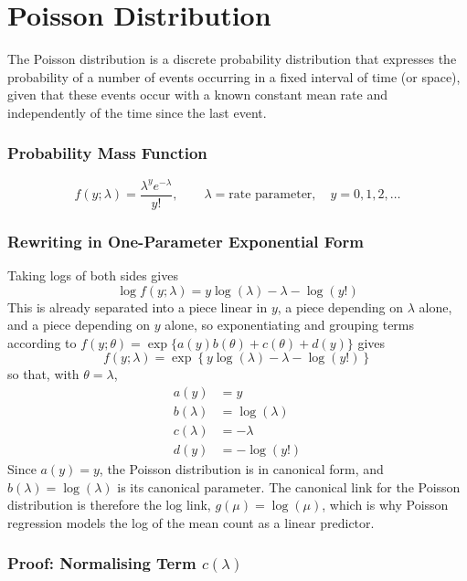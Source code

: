 \documentclass[12pt,a4paper]{report}
\begin{document}
\section{Poisson Distribution}

The Poisson distribution is a discrete probability distribution that expresses the probability of a number of events occurring in a fixed interval of time (or space), given that these events occur with a known constant mean rate and independently of the time since the last event.

\subsubsection*{Probability Mass Function}

\[
f(y;\lambda) = \frac{\lambda^{y}e^{-\lambda}}{y!}, \qquad \lambda = \text{rate parameter}, \quad y = 0,1,2,\dots
\]

\subsubsection*{Rewriting in One-Parameter Exponential Form}

Taking logs of both sides gives
\[
\log f(y;\lambda) = y\log(\lambda) - \lambda - \log(y!)
\]
This is already separated into a piece linear in $y$, a piece depending on $\lambda$ alone, and a piece depending on $y$ alone, so exponentiating and grouping terms according to $f(y;\theta) = \exp\{a(y)b(\theta) + c(\theta) + d(y)\}$ gives
\[
f(y;\lambda) = \exp\left\{y\log(\lambda) - \lambda - \log(y!)\right\}
\]
so that, with $\theta = \lambda$,
\begin{align*}
a(y) &= y \\[4pt]
b(\lambda) &= \log(\lambda) \\[4pt]
c(\lambda) &= -\lambda \\[4pt]
d(y) &= -\log(y!)
\end{align*}
Since $a(y) = y$, the Poisson distribution is in canonical form, and $b(\lambda) = \log(\lambda)$ is its canonical parameter. The canonical link for the Poisson distribution is therefore the log link, $g(\mu) = \log(\mu)$, which is why Poisson regression models the log of the mean count as a linear predictor.

\subsubsection*{Proof: Normalising Term $c(\lambda)$}
\end{document}
